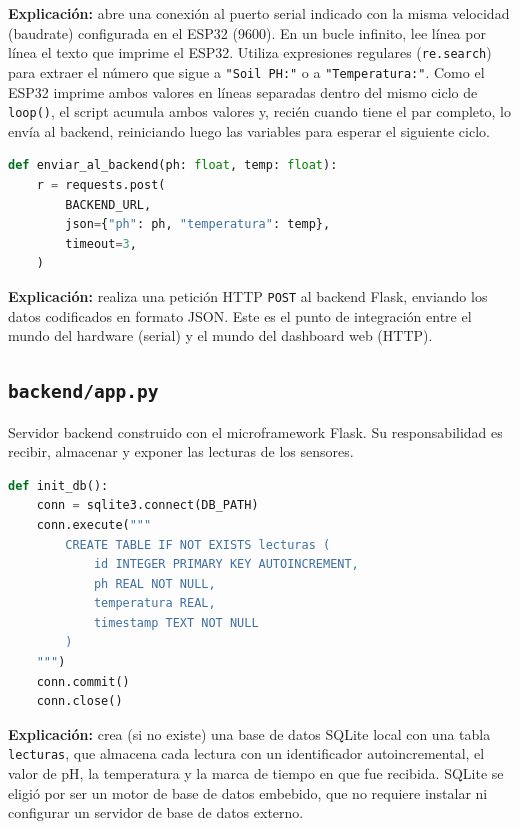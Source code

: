 \documentclass[11pt,a4paper]{article}
\begin{document}
\textbf{Explicación:} abre una conexión al puerto serial indicado
con la misma velocidad (baudrate) configurada en el ESP32
(9600). En un bucle infinito, lee línea por línea el texto que
imprime el ESP32. Utiliza expresiones regulares
(\texttt{re.search}) para extraer el número que sigue a
\texttt{"Soil PH:"} o a \texttt{"Temperatura:"}. Como el ESP32
imprime ambos valores en líneas separadas dentro del mismo ciclo de
\texttt{loop()}, el script acumula ambos valores y, recién cuando
tiene el par completo, lo envía al backend, reiniciando luego las
variables para esperar el siguiente ciclo.

\begin{lstlisting}[language=Python,caption={enviar\_al\_backend(ph, temp)}]
def enviar_al_backend(ph: float, temp: float):
    r = requests.post(
        BACKEND_URL,
        json={"ph": ph, "temperatura": temp},
        timeout=3,
    )
\end{lstlisting}

\textbf{Explicación:} realiza una petición HTTP \texttt{POST} al
backend Flask, enviando los datos codificados en formato JSON. Este
es el punto de integración entre el mundo del hardware (serial) y el
mundo del dashboard web (HTTP).

\subsection{\texttt{backend/app.py}}

Servidor backend construido con el microframework Flask. Su
responsabilidad es recibir, almacenar y exponer las lecturas de los
sensores.

\begin{lstlisting}[language=Python,caption={init\_db()}]
def init_db():
    conn = sqlite3.connect(DB_PATH)
    conn.execute("""
        CREATE TABLE IF NOT EXISTS lecturas (
            id INTEGER PRIMARY KEY AUTOINCREMENT,
            ph REAL NOT NULL,
            temperatura REAL,
            timestamp TEXT NOT NULL
        )
    """)
    conn.commit()
    conn.close()
\end{lstlisting}

\textbf{Explicación:} crea (si no existe) una base de datos SQLite
local con una tabla \texttt{lecturas}, que almacena cada lectura con
un identificador autoincremental, el valor de pH, la temperatura y
la marca de tiempo en que fue recibida. SQLite se eligió por ser un
motor de base de datos embebido, que no requiere instalar ni
configurar un servidor de base de datos externo.
\end{document}
